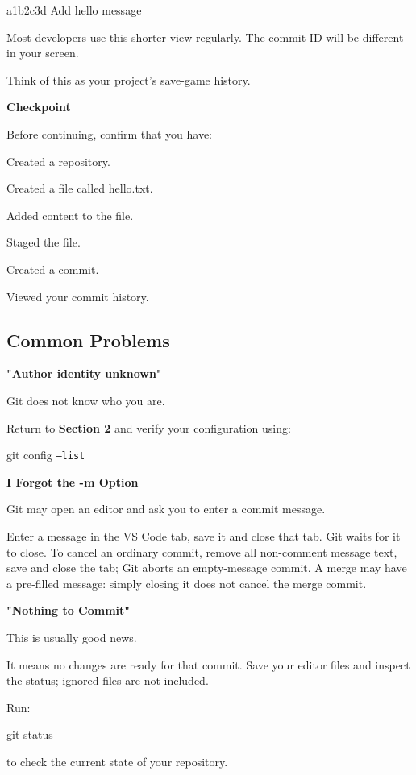 \documentclass{csc2059practical}
\begin{document}
\begin{terminalplain}
a1b2c3d Add hello message
\end{terminalplain}
Most developers use this shorter view regularly. The commit ID will be different in your screen.

Think of this as your project's save-game history.

\begin{reflectionbox}
\textbf{Checkpoint}\par
\medskip
Before continuing, confirm that you have:

Created a repository.

Created a file called hello.txt.

Added content to the file.

Staged the file.

Created a commit.

Viewed your commit history.
\end{reflectionbox}
\subsection{Common Problems}
\begin{commonerror}
\textbf{"Author identity unknown"}\par
\medskip
Git does not know who you are.

Return to \textbf{Section 2} and verify your configuration using:

\begin{terminalplain}
  git config \texttt{--list}
\end{terminalplain}
\end{commonerror}
\begin{commonerror}
\textbf{I Forgot the -m Option}\par
\medskip
Git may open an editor and ask you to enter a commit message.

Enter a message in the VS Code tab, save it and close that tab. Git waits for it to close. To cancel an ordinary commit, remove all non-comment message text, save and close the tab; Git aborts an empty-message commit. A merge may have a pre-filled message: simply closing it does not cancel the merge commit.
\end{commonerror}
\begin{commonerror}
\textbf{"Nothing to Commit"}\par
\medskip
This is usually good news.

It means no changes are ready for that commit. Save your editor files and inspect the status; ignored files are not included.

Run:

\begin{terminalplain}
  git status
\end{terminalplain}
to check the current state of your repository.
\end{commonerror}
\end{document}
